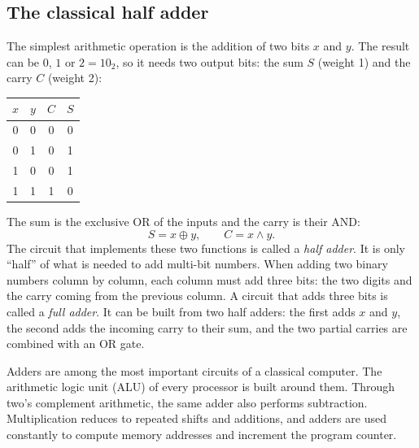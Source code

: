 \subsection{The classical half adder}
The simplest arithmetic operation is the addition of two bits $x$ and $y$. The result can be $0$, $1$ or $2=10_2$, so it needs two output bits: the sum $S$ (weight 1) and the carry $C$ (weight 2):
\begin{center}
\begin{tabular}{@{}cc|cc@{}}\toprule
$x$&$y$&$C$&$S$\\ \midrule 0&0&0&0\\0&1&0&1\\1&0&0&1\\1&1&1&0\\ \bottomrule
\end{tabular}
\end{center}
The sum is the exclusive OR of the inputs and the carry is their AND:
\begin{equation}
  S=x\oplus y,\qquad C=x\wedge y.
\end{equation}
The circuit that implements these two functions is called a \emph{half adder}. It is only ``half'' of what is needed to add multi-bit numbers. When adding two binary numbers column by column,
each column must add three bits: the two digits and the carry coming from the previous column. A circuit that adds three bits is called a \emph{full adder}. It can be built from two half adders:
the first adds $x$ and $y$, the second adds the incoming carry to their sum, and the two partial carries are combined with an OR gate.

Adders are among the most important circuits of a classical computer. The arithmetic logic unit (ALU) of every processor is built around them. Through two's complement arithmetic, the same
adder also performs subtraction. Multiplication reduces to repeated shifts and additions, and adders are used constantly to compute memory addresses and increment the program counter.

